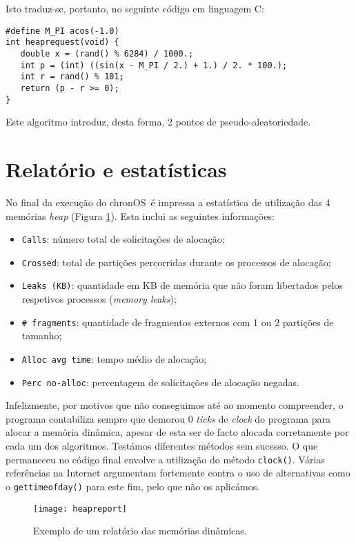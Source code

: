 \documentclass[10pt,oneside]{estiloUBI}
\newcommand{\chronOS}{\textsf{chronOS}}
\begin{document}
	Isto traduz-se, portanto, no seguinte código em linguagem C:

	\begin{verbatim}
#define M_PI acos(-1.0)
int heaprequest(void) {
   double x = (rand() % 6284) / 1000.;
   int p = (int) ((sin(x - M_PI / 2.) + 1.) / 2. * 100.);
   int r = rand() % 101;
   return (p - r >= 0);
}
	\end{verbatim}
	
	Este algoritmo introduz, desta forma, 2 pontos de pseudo-aleatoriedade.
	
	
	\section{Relatório e estatísticas}
	\label{ssec:heap:stat}
	
	No final da execução do \chronOS~é impressa a estatística de utilização das 4 memórias \textit{heap} (Figura \ref{fig:heapreport}). Esta inclui as seguintes informações:
	
	\begin{itemize}
		\item \verb|Calls|: número total de solicitações de alocação;
		\item \verb|Crossed|: total de partições percorridas durante os processos de alocação;
		\item \verb|Leaks (KB)|: quantidade em KB de memória que não foram libertados pelos respetivos processos (\textit{memory leaks});
		\item \verb|# fragments|: quantidade de fragmentos externos com 1 ou 2 partições de tamanho;
		\item \verb|Alloc avg time|: tempo médio de alocação;
		\item \verb|Perc no-alloc|: percentagem de solicitações de alocação negadas.
	\end{itemize}
	
	Infelizmente, por motivos que não conseguimos até ao momento compreender, o programa contabiliza sempre que demorou 0 \textit{ticks} de \textit{clock} do programa para alocar a memória dinâmica, apesar de esta ser de facto alocada corretamente por cada um dos algoritmos. Testámos diferentes métodos sem sucesso. O que permaneceu no código final envolve a utilização do método \verb|clock()|. Várias referências na Internet argumentam fortemente contra o uso de alternativas como o \verb|gettimeofday()| para este fim, pelo que não os aplicámos.
	
	\begin{figure}[!htbp]
		\centering
		\texttt{[image: heapreport]}
		\caption{Exemplo de um relatório das memórias dinâmicas.}
		\label{fig:heapreport}
	\end{figure}
\end{document}
